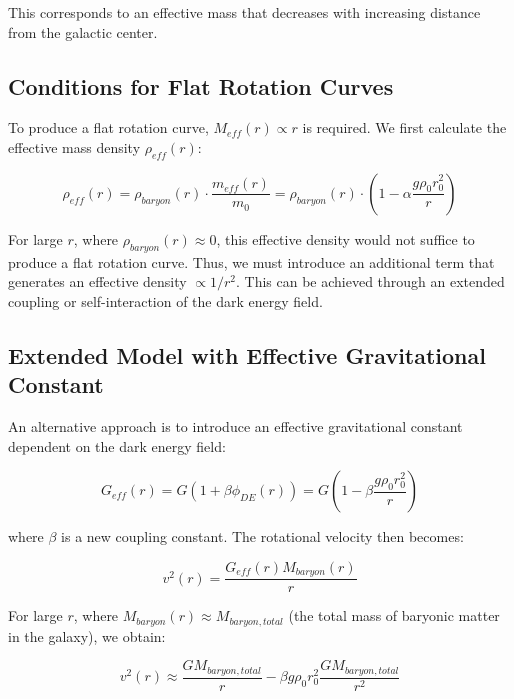 \documentclass[a4paper,12pt]{article}
\begin{document}
	This corresponds to an effective mass that decreases with increasing distance from the galactic center.
	
	\subsection{Conditions for Flat Rotation Curves}
	
	To produce a flat rotation curve, $M_{eff}(r) \propto r$ is required. We first calculate the effective mass density $\rho_{eff}(r)$:
	
	\begin{equation}
		\rho_{eff}(r) = \rho_{baryon}(r) \cdot \frac{m_{eff}(r)}{m_0} = \rho_{baryon}(r) \cdot \left(1 - \alpha\frac{g\rho_0 r_0^2}{r}\right)
	\end{equation}
	
	For large $r$, where $\rho_{baryon}(r) \approx 0$, this effective density would not suffice to produce a flat rotation curve. Thus, we must introduce an additional term that generates an effective density $\propto 1/r^2$. This can be achieved through an extended coupling or self-interaction of the dark energy field.
	
	\subsection{Extended Model with Effective Gravitational Constant}
	
	An alternative approach is to introduce an effective gravitational constant dependent on the dark energy field:
	
	\begin{equation}
		G_{eff}(r) = G\left(1 + \beta\phi_{DE}(r)\right) = G\left(1 - \beta\frac{g\rho_0 r_0^2}{r}\right)
	\end{equation}
	
	where $\beta$ is a new coupling constant. The rotational velocity then becomes:
	
	\begin{equation}
		v^2(r) = \frac{G_{eff}(r)M_{baryon}(r)}{r}
	\end{equation}
	
	For large $r$, where $M_{baryon}(r) \approx M_{baryon,total}$ (the total mass of baryonic matter in the galaxy), we obtain:
	
	\begin{equation}
		v^2(r) \approx \frac{GM_{baryon,total}}{r} - \beta g\rho_0 r_0^2 \frac{GM_{baryon,total}}{r^2}
	\end{equation}
	
\end{document}
